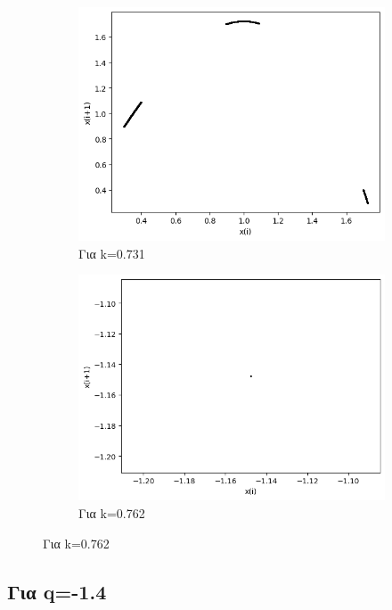 \begin{figure}[h!]
\begin{subfigure}[b]{0.25\textwidth}
		\includegraphics[width=\textwidth]{LateX images/graphs q12/g11}
		\caption{Για k=0.731}
		\label{f:k67}
	\end{subfigure}
	\hfill
	\begin{subfigure}[b]{0.25\textwidth}
		\centering
		\includegraphics[width=\textwidth]{LateX images/graphs q12/g12}
		\caption{Για k=0.762}
		\label{f:k68}
	\end{subfigure}
	\hfill
	
\end{figure}

\clearpage

\subsection{Για q=-1.4}

